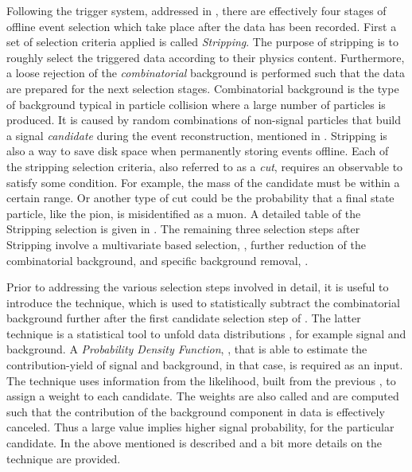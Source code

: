 
Following the trigger system, addressed in , there are effectively four stages of offline event
selection which take place after the data has been recorded.
First a set of selection criteria applied is called {\it Stripping}. The purpose of stripping is to roughly
select the triggered data according to their physics content. Furthermore, a loose rejection of the {\it combinatorial}
background is performed such that the data are prepared for the next selection stages.
Combinatorial background is the type of background typical in particle collision where a large number of
particles is produced. It is caused by random combinations of non-signal particles that build a signal
{\it candidate} during the event reconstruction, mentioned in .
Stripping is also a way to save disk space when permanently storing events offline.
Each of the stripping selection criteria, also referred to as a {\it cut},
requires an observable to satisfy some condition. For example, the mass of the \Bs candidate must be within
a certain range. Or another type of cut could be the probability that a final state particle, like the pion, is misidentified
as a muon. A detailed table of the Stripping selection is given in .
The remaining three selection steps after Stripping involve a multivariate based selection, ,
further reduction of the combinatorial background,  and specific background removal,
.

Prior to addressing the various selection steps involved in detail, it is useful to introduce the
\sPlot technique, which is used to statistically subtract the combinatorial background further after the first
candidate selection step of . The latter technique is a statistical
tool to unfold data distributions \cite{splot}, for example signal and background. A {\it Probability Density Function},
\pdf, that is able to estimate the contribution-yield of signal and background, in that case, is required as an input.
The \sPlot technique uses information from the likelihood, built from the previous \pdf, to assign a
weight to each candidate. The weights are also called {\sWeights} and are computed such that the contribution
of the background component in data is effectively canceled. Thus a large \sWeight value implies
higher signal probability, for the particular candidate. In  the above
mentioned \pdf is described and a bit more details on the \sPlot technique are provided.

